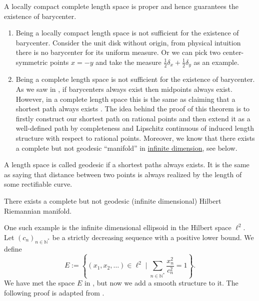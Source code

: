 \begin{example}
	A locally compact complete length space is proper and hence guarantees the existence of barycenter.
	\begin{enumerate}
		\item Being a locally compact length space is not sufficient for the existence of barycenter.
		      Consider the unit disk without origin,
		      from physical intuition there is no barycenter for its uniform measure.
		      Or we can pick two center-symmetric points $x = - y$ and
		      take the measure $\frac{1}{2}\delta_x + \frac{1}{2}\delta_y$ as an example.
		\item Being a complete length space is not sufficient for the existence of barycenter.
			As we saw in ,
			if barycenters always exist then midpoints always exist.
		      However, in a complete length space this is the same as claiming that a shortest path always exists
		\cite[Theorem 2.4.16]{burago2001course}.
		      The idea behind the proof of this theorem
		      is to firstly construct our shortest path on rational points and then extend it
		      as a well-defined path by completeness and Lipschitz continuous of induced length structure with respect to rational points.
		      Moreover, we know that there exists a complete but not geodesic ``manifold''
		      in \underline{infinite dimension}, see  below.
	\end{enumerate}
\end{example}

\begin{defn}
	A length space is called geodesic if a shortest paths always exists.
	It is the same as saying that distance between two points is always realized by the length of some rectifiable curve.
\end{defn}

\begin{lem}
	\label{lem:infinite_not_geodesic_manifold}
	There exists a complete but not geodesic (infinite dimensional) Hilbert Riemannian manifold.
\end{lem}

One such example is the infinite dimensional ellipsoid in the Hilbert space $\ell^2$.
Let $(c_n)_{n \in \mathbb{N}^*}$ be a strictly decreasing sequence with a positive lower bound.
We define
\[
	E := \left\{ \left( x _ { 1 } , x _ { 2 } , \ldots \right) \in \ell^2 \mid \sum _ { n \in \mathbb { N }^* } \frac { x _ { n } ^ { 2 } } { c _ { n } ^ { 2 } } = 1 \right\}.
\]
We have met the space $E$ in ,
but now we add a smooth structure to it.
The following proof is adapted from \cite[Example 5.1]{grossman1965hilbert}.


